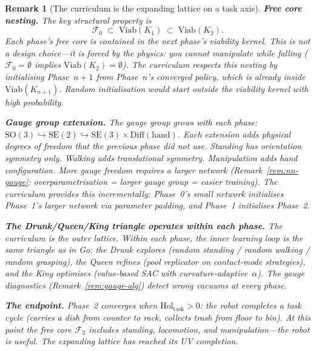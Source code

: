 \documentclass[11pt,a4paper]{article}
\newtheorem{remark}[theorem]{Remark}
\newcommand{\cF}{\mathcal{F}}
\begin{document}
\begin{remark}[The curriculum is the expanding lattice
  on a task axis]
\medskip\noindent
\textbf{Free core nesting.}\;
The key structural property is
\begin{equation}\label{eq:free-core-nesting}
  \cF_0
  \;\subset\;
  \mathrm{Viab}(K_1)
  \;\subset\;
  \mathrm{Viab}(K_2).
\end{equation}
Each phase's free core is contained in the
next phase's viability kernel.
This is not a design choice---it is forced
by the physics:
you cannot manipulate while falling
($\cF_0 = \emptyset$ implies
$\mathrm{Viab}(K_2) = \emptyset$).
The curriculum respects this nesting
by initialising Phase~$n{+}1$
from Phase~$n$'s converged policy,
which is already inside $\mathrm{Viab}(K_{n+1})$.
Random initialisation would start outside
the viability kernel with high probability.

\medskip\noindent
\textbf{Gauge group extension.}\;
The gauge group grows with each phase:
$\mathrm{SO}(3)
  \hookrightarrow \mathrm{SE}(2)
  \hookrightarrow \mathrm{SE}(3)
  \times \mathrm{Diff}(\text{hand})$.
Each extension adds physical degrees of freedom
that the previous phase did not use.
Standing has orientation symmetry only.
Walking adds translational symmetry.
Manipulation adds hand configuration.
More gauge freedom requires a larger network
(Remark~\ref{rem:nn-gauge}:
overparametrisation = larger gauge group = easier
training).
The curriculum provides this incrementally:
Phase~0's small network initialises
Phase~1's larger network via parameter padding,
and Phase~1 initialises Phase~2.

\medskip\noindent
\textbf{The Drunk/Queen/King triangle
operates within each phase.}\;
The curriculum is the \emph{outer} lattice.
Within each phase, the \emph{inner} learning
loop is the same triangle as in Go:
the Drunk explores
(random standing / random walking /
random grasping),
the Queen refines
(pool replicator on contact-mode strategies),
and the King optimises
(value-based SAC with
curvature-adaptive~$\alpha$).
The gauge diagnostics
(Remark~\ref{rem:gauge-alg})
detect wrong vacuums at every phase.

\medskip\noindent
\textbf{The endpoint.}\;
Phase~2 converges when
$\mathrm{Hol}_{\mathrm{task}} > 0$:
the robot completes a task cycle
(carries a dish from counter to rack,
collects trash from floor to bin).
At this point the free core
$\cF_2$ includes standing, locomotion,
and manipulation---the robot is \emph{useful}.
The expanding lattice has reached its
UV completion.
\end{remark}
\end{document}
